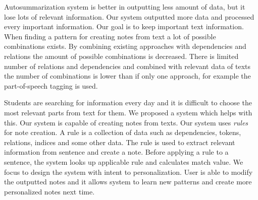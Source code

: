 \documentclass{iitsrc}
\begin{document}
	Autosummarization system is better in outputting less amount of data, but it lose lots of relevant information. Our system outputted more data and processed every important information. Our goal is to keep important text information.
%		
%		
	When finding a pattern for creating notes from text a lot of possible combinations exists. By combining existing approaches with dependencies and relations the amount of possible combinations is decreased. There is limited number of relations and dependencies and combined with relevant data of texts the number of combinations is lower than if only one approach, for example the part-of-speech tagging is used.
	
	Students are searching for information every day and it is difficult to choose the most relevant parts from text for them. We proposed a system which helps with this. Our system is capable of creating notes from texts. Our system uses \textit{rules} for note creation. A rule is a collection of data such as dependencies, tokens, relations, indices and some other data. The rule is used to extract relevant information from sentence and create a note. Before applying a rule to a sentence, the system looks up applicable rule and calculates match value. We focus to design the system with intent to personalization. User is able to modify the outputted notes and it allows system to learn new patterns and create more personalized notes next time.
	
\end{document}
